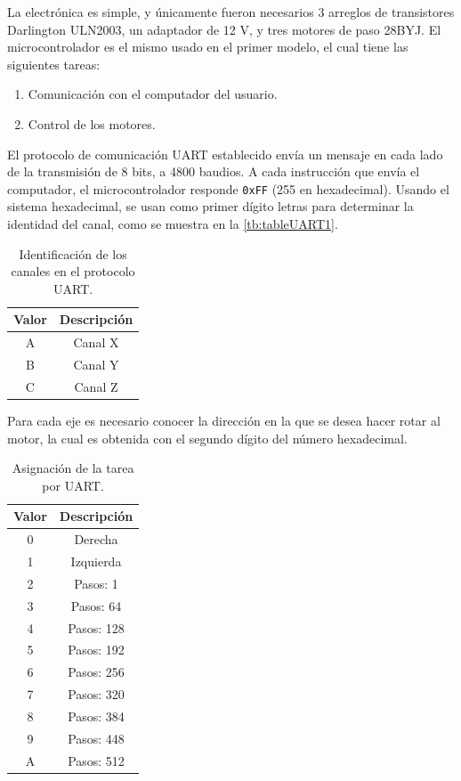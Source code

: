 La electrónica es simple, y únicamente fueron necesarios 3 arreglos de transistores Darlington ULN2003, un adaptador de 12 V, y tres motores de paso 28BYJ. El microcontrolador es el mismo usado en el primer modelo, el cual tiene las siguientes tareas: 
\begin{enumerate}
	\item Comunicación con el computador del usuario.
	\item Control de los motores.
\end{enumerate}

El protocolo de comunicación UART establecido envía un mensaje en cada lado de la transmisión de 8 bits, a 4800 baudios. A cada instrucción que envía el computador, el microcontrolador responde \texttt{0xFF} (255 en hexadecimal). Usando el sistema hexadecimal, se usan como primer dígito letras para determinar la identidad del canal, como se muestra en la \autoref{tb:tableUART1}.
\begin{table}[h]
	\centering
	\caption{Identificación de los canales en el protocolo UART.}
	\label{tb:tableUART1}
	\begin{tabular}{cc}
		\hline
		\textbf{Valor} & \textbf{Descripción}\\
		\hline
		A & Canal X \\
		B & Canal Y \\
		C & Canal Z \\
		\hline
	\end{tabular}
\end{table}

Para cada eje es necesario conocer la dirección en la que se desea hacer rotar al motor, la cual es obtenida con el segundo dígito del número hexadecimal.
\begin{table}[h]
	\centering
	\caption{Asignación de la tarea por UART.}
	\label{tb:tableUART2}
	\scriptsize
	\begin{tabular}{cc}
		\hline
		\textbf{Valor} & \textbf{Descripción}\\
		\hline
		0 & Derecha \\
		1 & Izquierda \\
		2 & Pasos: 1 \\
		3 & Pasos: 64 \\
		4 & Pasos: 128 \\
		5 & Pasos: 192 \\
		6 & Pasos: 256 \\
		7 & Pasos: 320 \\
		8 & Pasos: 384 \\
		9 & Pasos: 448 \\
		A & Pasos: 512 \\
		\hline
	\end{tabular}
\end{table}
\newpage

